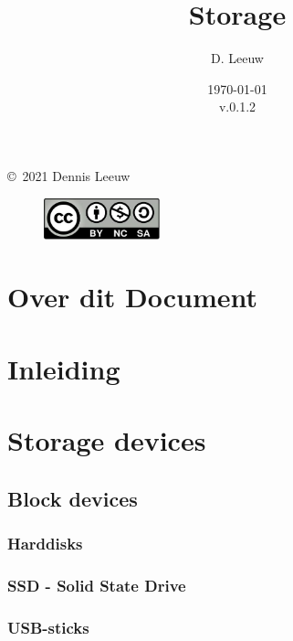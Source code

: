 \documentclass[a4paper,12pt,twoside,openright,titlepage]{book}
\author{D. Leeuw}
\title{Storage}
\date{\today\\v.0.1.2}
\begin{document}

\maketitle

\copyright\ 2021 Dennis Leeuw\\

\begin{figure}
\includegraphics[width=0.3\textwidth]{CC-BY-SA-NC.png}
\end{figure}

\bigskip




\frontmatter
\chapter{Over dit Document}



\tableofcontents

\mainmatter
\chapter{Inleiding}


\chapter{Storage devices}
\section{Block devices}

\subsection{Harddisks}

\subsection{SSD - Solid State Drive}
\subsection{USB-sticks}
\end{document}
